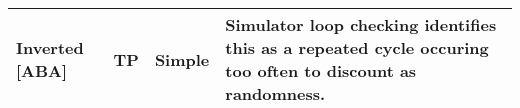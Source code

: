 \begin{center}
\begin{tabularx}{\textwidth}{ || p{} | p{} | p{} | p{} || }
Inverted \m{supportCoin} [ABA] & TP & Simple & Simulator loop checking identifies this as a repeated cycle occuring too often to discount as randomness. 
\\ \hline
\hline
\end{tabularx}
\end{center}
